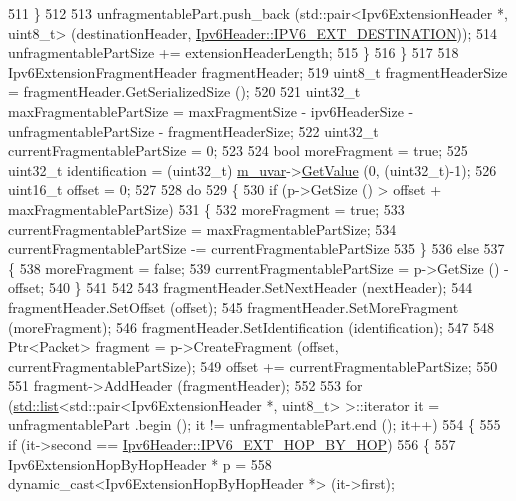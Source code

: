 \begin{DoxyCode}
511             \}
512 
513           unfragmentablePart.push\_back (std::pair<Ipv6ExtensionHeader *, uint8\_t> (destinationHeader, 
      \hyperlink{classns3_1_1Ipv6Header_a226429221a066c5e3b1f260caf27d1e9abfe6e82da1c9945685a3bf9dbfbe974b}{Ipv6Header::IPV6\_EXT\_DESTINATION}));
514           unfragmentablePartSize += extensionHeaderLength;
515         \}
516     \}
517 
518   Ipv6ExtensionFragmentHeader fragmentHeader;
519   uint8\_t fragmentHeaderSize = fragmentHeader.GetSerializedSize ();
520 
521   uint32\_t maxFragmentablePartSize = maxFragmentSize - ipv6HeaderSize - unfragmentablePartSize - 
      fragmentHeaderSize;
522   uint32\_t currentFragmentablePartSize = 0;
523 
524   \textcolor{keywordtype}{bool} moreFragment = \textcolor{keyword}{true};
525   uint32\_t identification = (uint32\_t) \hyperlink{classns3_1_1Ipv6Extension_a785a3e81279962a9515646780b08e26a}{m\_uvar}->\hyperlink{classns3_1_1UniformRandomVariable_a03822d8c86ac51e9aa83bbc73041386b}{GetValue} (0, (uint32\_t)-1);
526   uint16\_t offset = 0;
527 
528   \textcolor{keywordflow}{do}
529     \{
530       \textcolor{keywordflow}{if} (p->GetSize () > offset + maxFragmentablePartSize)
531         \{
532           moreFragment = \textcolor{keyword}{true};
533           currentFragmentablePartSize = maxFragmentablePartSize;
534           currentFragmentablePartSize -= currentFragmentablePartSize %
535         \}
536       \textcolor{keywordflow}{else}
537         \{
538           moreFragment = \textcolor{keyword}{false};
539           currentFragmentablePartSize = p->GetSize () - offset;
540         \}
541 
542 
543       fragmentHeader.SetNextHeader (nextHeader);
544       fragmentHeader.SetOffset (offset);
545       fragmentHeader.SetMoreFragment (moreFragment);
546       fragmentHeader.SetIdentification (identification);
547 
548       Ptr<Packet> fragment = p->CreateFragment (offset, currentFragmentablePartSize);
549       offset += currentFragmentablePartSize;
550 
551       fragment->AddHeader (fragmentHeader);
552 
553       \textcolor{keywordflow}{for} (\hyperlink{openflow-interface_8h_afd9bcfa176617760671b67580f536fa7}{std::list}<std::pair<Ipv6ExtensionHeader *, uint8\_t> >::iterator it = unfragmentablePart
      .begin (); it != unfragmentablePart.end (); it++)
554         \{
555           \textcolor{keywordflow}{if} (it->second == \hyperlink{classns3_1_1Ipv6Header_a226429221a066c5e3b1f260caf27d1e9aa0413202f88bebb4f91a138e317b6bbd}{Ipv6Header::IPV6\_EXT\_HOP\_BY\_HOP})
556             \{
557               Ipv6ExtensionHopByHopHeader * p =
558                 \textcolor{keyword}{dynamic\_cast<}Ipv6ExtensionHopByHopHeader *\textcolor{keyword}{>} (it->first);

\end{DoxyCode}
